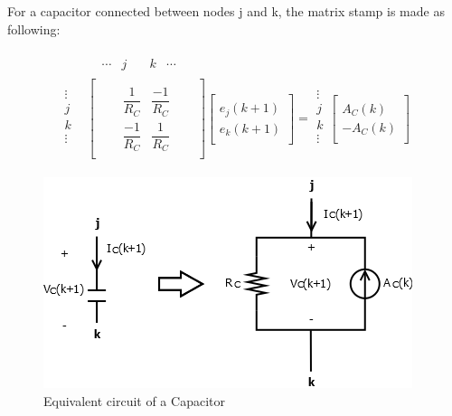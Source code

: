 For a capacitor connected between nodes j and k, the matrix stamp is made as following:

\begin{align}
\begin{split}
&
\begin{matrix}
& \cdots & j & \quad k & \cdots
\end{matrix}\\[-6pt]
\begin{matrix}
\vdots\\[6pt]
j\\[6pt]
k\\[6pt]
\vdots\\
\end{matrix}
&
\begin{bmatrix}
	\quad & \quad &  \\[6pt]
	\quad & \dfrac{1}{R_C} & \dfrac{-1}{R_C} & \quad  \\[6pt]
	\quad & \dfrac{-1}{R_C} & \dfrac{1}{R_C} & \quad \\[6pt]
	\quad &  & 
\end{bmatrix}
\begin{bmatrix}
	\quad \\[6pt]
	e_j(k+1)\\[6pt]
	e_k(k+1)\\[6pt]
	\quad
\end{bmatrix}
=
\begin{matrix}
\vdots\\[6pt]
j\\[6pt]
k\\[6pt]
\vdots\\
\end{matrix}
\begin{bmatrix}
	\quad \\[6pt]
	A_C(k)\\[6pt]
	-A_C(k)\\[6pt]
	\quad
\end{bmatrix}
\end{split}
\end{align}

\begin{figure}[ht]
	\centering
	\includegraphics[scale=0.6]{img/Capacitor.png} 
	\caption{Equivalent circuit of a Capacitor}
	\label{fig:Capacitor}
\end{figure}



